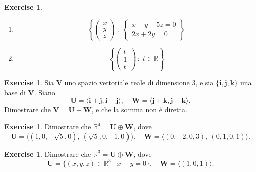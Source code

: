 \documentclass{article}
\theoremstyle{plain}
\theoremstyle{definition}
\newtheorem{xca}[exmp]{Exercise}
\theoremstyle{remark}
\begin{document}
\begin{bxthm}
\begin{xca}
\begin{multicols}{2}
\begin{enumerate}
            \item \[\left\{\begin{pmatrix}x\\y \\z \end{pmatrix}\,:\;\begin{cases}x+y-5z=0\\2x+2y=0\end{cases}\right\}\]
            \item \[\left\{\begin{pmatrix}t\\1 \\t \end{pmatrix}\,:\;t\in\mathbb{R}\right\}\]
        \end{enumerate}
    \end{multicols}
\end{xca}
\end{bxthm}

\begin{bxthm}
\begin{xca}
    Sia $\mathbf{V}$ uno spazio vettoriale reale di dimensione $3$, e sia $\{\mathbf{i}, \mathbf{j}, \mathbf{k}\}$ una base di $\mathbf{V}$. Siano 
    \[
    \mathbf{U} = \langle \mathbf{i} + \mathbf{j}, \mathbf{i} - \mathbf{j} \rangle,\quad \mathbf{W} = \langle \mathbf{j} + \mathbf{k}, \mathbf{j} - \mathbf{k} \rangle.
    \]
    Dimostrare che $\mathbf{V} = \mathbf{U} + \mathbf{W}$, e che la somma non è diretta.
\end{xca}
\end{bxthm}

\vspace{10pt}

\begin{bxthm}
\begin{xca}
    Dimostrare che $\mathbb{R}^4 = \mathbf{U} \oplus \mathbf{W}$, dove
    \[
    \mathbf{U} = \langle (1, 0, -\sqrt{5}, 0),\ (\sqrt{5}, 0, -1, 0) \rangle, \quad
    \mathbf{W} = \langle (0, -2, 0, 3),\ (0, 1, 0, 1) \rangle.
    \]
\end{xca}
\end{bxthm}

\vspace{10pt}

\begin{bxthm}
\begin{xca}
    Dimostrare che $\mathbb{R}^3 = \mathbf{U} \oplus \mathbf{W}$, dove
    \[
    \mathbf{U} = \{ (x, y, z) \in \mathbb{R}^3 \mid x-y=0 \}, \quad
    \mathbf{W} = \langle (1, 0,1) \rangle.
    \]
\end{xca}
\end{bxthm}
\end{document}
